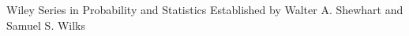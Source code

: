 \cleardoublepage
{}
{}
\begin{thebibliography}{}
		Wiley Series in Probability and Statistics Established by Walter A. Shewhart and Samuel S. Wilks
\end{thebibliography}